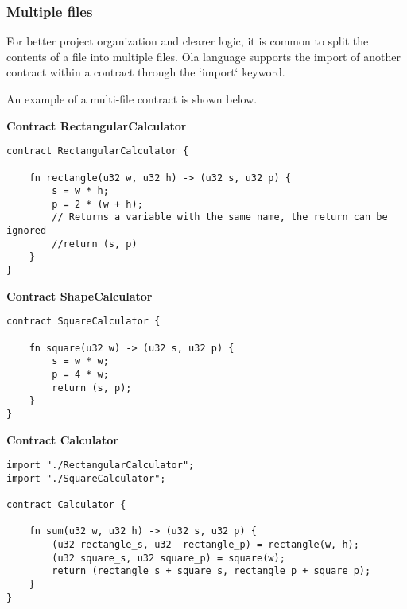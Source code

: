\subsubsection{Multiple files}

For better project organization and clearer logic, it is common to split the contents of a file into multiple files. Ola language supports the import of another contract within a contract through the `import` keyword.

An example of a multi-file contract is shown below.

\textbf{Contract RectangularCalculator}

\begin{lstlisting}
contract RectangularCalculator {
  
    fn rectangle(u32 w, u32 h) -> (u32 s, u32 p) {
        s = w * h;
        p = 2 * (w + h);
        // Returns a variable with the same name, the return can be ignored
        //return (s, p)
    }
}
\end{lstlisting}

\textbf{Contract ShapeCalculator}

\begin{lstlisting}
contract SquareCalculator {

    fn square(u32 w) -> (u32 s, u32 p) {
        s = w * w;
        p = 4 * w;
        return (s, p);
    }
}
\end{lstlisting}

\textbf{Contract Calculator}

\begin{lstlisting}
import "./RectangularCalculator";
import "./SquareCalculator";

contract Calculator {
  
    fn sum(u32 w, u32 h) -> (u32 s, u32 p) {
        (u32 rectangle_s, u32  rectangle_p) = rectangle(w, h);
        (u32 square_s, u32 square_p) = square(w);
        return (rectangle_s + square_s, rectangle_p + square_p);
    }
}
\end{lstlisting}

